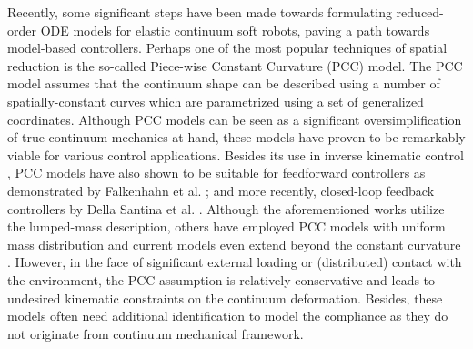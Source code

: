 Recently, some significant steps have been made towards formulating reduced-order ODE models for elastic continuum soft robots, paving a path towards model-based controllers. Perhaps one of the most popular techniques of spatial reduction is the so-called Piece-wise Constant Curvature (PCC) model. The PCC model assumes that the continuum shape can be described using a number of spatially-constant curves which are parametrized using a set of generalized coordinates. Although PCC models can be seen as a significant oversimplification of true continuum mechanics at hand, these models have proven to be remarkably viable for various control applications. Besides its use in inverse kinematic control \cite{Marchese2014,Marchese2016,Jones2006}, PCC models have also shown to be suitable for feedforward controllers as demonstrated by Falkenhahn et al. \cite{Falkenhahn2015}; and more recently, closed-loop feedback controllers by Della Santina et al. \cite{Santina2020,Katzschmann2019}. Although the aforementioned works utilize the lumped-mass description, others have employed PCC models with uniform mass distribution \cite{Renda2018,Godage2015,Godage2016,Tatlicioglu2007} and current models even extend beyond the constant curvature \cite{Mochiyama2003,Chirikjian1994,Santina2020b}. However, in the face of significant external loading or (distributed) contact with the environment, the PCC assumption is relatively conservative and leads to undesired kinematic constraints on the continuum deformation. Besides, these models often need additional identification to model the compliance as they do not originate from continuum mechanical framework.

